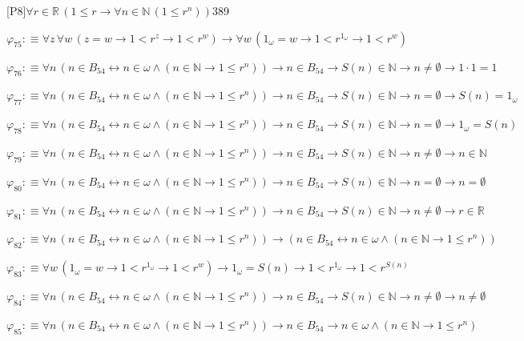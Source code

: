 \begin{fullproof}{[P8]}{$\forall r \in \mathbb{R}\,(1 \leq r \to \forall n \in \mathbb{N}\,(1 \leq {{r}^{n}}))$}{389}
\begin{abbrevlist}
\item $\varphi_{75} :\equiv \forall z\,\forall w\,(z = w \to 1 < {{r}^{z}} \to 1 < {{r}^{w}}) \to \forall w\,(1_{\omega} = w \to 1 < {{r}^{1_{\omega}}} \to 1 < {{r}^{w}})$
\item $\varphi_{76} :\equiv \forall n\,(n \in B_{54} \leftrightarrow n \in \omega \land (n \in \mathbb{N} \to 1 \leq {{r}^{n}})) \to n \in B_{54} \to S(n) \in \mathbb{N} \to n \neq \emptyset \to 1 \cdot 1 = 1$
\item $\varphi_{77} :\equiv \forall n\,(n \in B_{54} \leftrightarrow n \in \omega \land (n \in \mathbb{N} \to 1 \leq {{r}^{n}})) \to n \in B_{54} \to S(n) \in \mathbb{N} \to n = \emptyset \to S(n) = 1_{\omega}$
\item $\varphi_{78} :\equiv \forall n\,(n \in B_{54} \leftrightarrow n \in \omega \land (n \in \mathbb{N} \to 1 \leq {{r}^{n}})) \to n \in B_{54} \to S(n) \in \mathbb{N} \to n = \emptyset \to 1_{\omega} = S(n)$
\item $\varphi_{79} :\equiv \forall n\,(n \in B_{54} \leftrightarrow n \in \omega \land (n \in \mathbb{N} \to 1 \leq {{r}^{n}})) \to n \in B_{54} \to S(n) \in \mathbb{N} \to n \neq \emptyset \to n \in \mathbb{N}$
\item $\varphi_{80} :\equiv \forall n\,(n \in B_{54} \leftrightarrow n \in \omega \land (n \in \mathbb{N} \to 1 \leq {{r}^{n}})) \to n \in B_{54} \to S(n) \in \mathbb{N} \to n = \emptyset \to n = \emptyset$
\item $\varphi_{81} :\equiv \forall n\,(n \in B_{54} \leftrightarrow n \in \omega \land (n \in \mathbb{N} \to 1 \leq {{r}^{n}})) \to n \in B_{54} \to S(n) \in \mathbb{N} \to n \neq \emptyset \to r \in \mathbb{R}$
\item $\varphi_{82} :\equiv \forall n\,(n \in B_{54} \leftrightarrow n \in \omega \land (n \in \mathbb{N} \to 1 \leq {{r}^{n}})) \to (n \in B_{54} \leftrightarrow n \in \omega \land (n \in \mathbb{N} \to 1 \leq {{r}^{n}}))$
\item $\varphi_{83} :\equiv \forall w\,(1_{\omega} = w \to 1 < {{r}^{1_{\omega}}} \to 1 < {{r}^{w}}) \to 1_{\omega} = S(n) \to 1 < {{r}^{1_{\omega}}} \to 1 < {{r}^{S(n)}}$
\item $\varphi_{84} :\equiv \forall n\,(n \in B_{54} \leftrightarrow n \in \omega \land (n \in \mathbb{N} \to 1 \leq {{r}^{n}})) \to n \in B_{54} \to S(n) \in \mathbb{N} \to n \neq \emptyset \to n \neq \emptyset$
\item $\varphi_{85} :\equiv \forall n\,(n \in B_{54} \leftrightarrow n \in \omega \land (n \in \mathbb{N} \to 1 \leq {{r}^{n}})) \to n \in B_{54} \to n \in \omega \land (n \in \mathbb{N} \to 1 \leq {{r}^{n}})$

\end{abbrevlist}
\end{fullproof}
